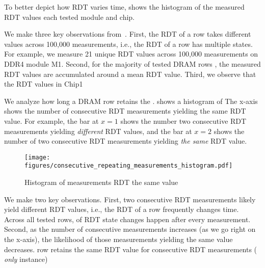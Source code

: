 To better depict how RDT varies  time,
 shows the histogram of the measured RDT values  each tested module and chip.


We make three key observations from~. First,
the RDT of a row takes  different values across 100,000
measurements, i.e., the RDT of a row has multiple states. For example, we
measure 21 unique RDT values across 100,000 measurements on DDR4 module M1.
Second, for the majority of tested DRAM rows , the
measured RDT values are accumulated around a mean RDT value. Third, we observe
that the RDT values in  Chip1 

We analyze how long a DRAM row retains the .  shows
a histogram of 
The x-axis shows the number of consecutive RDT measurements yielding the same
RDT value. For example, the bar at $x = 1$ shows the number  two
consecutive RDT measurements yielding \emph{different} RDT values, and the bar
at $x = 2$ shows the number of two consecutive RDT measurements yielding
\emph{the same} RDT value.

\begin{figure}[!ht]
    \centering
    \texttt{[image: figures/consecutive\_repeating\_measurements\_histogram.pdf]}
    \caption{Histogram of  measurements  RDT  the same value}
    \label{fig:consecutive_repeating_measurements}
\end{figure}


We make two key observations. First, two consecutive RDT measurements likely
yield different RDT values, i.e., the RDT of a row frequently changes  time.
Across all tested rows,  of RDT state changes happen after every
measurement. Second, as the number of consecutive measurements increases (as we
go right on the x-axis), the likelihood of those measurements yielding the same
value decreases.  row retains the same RDT value for 
consecutive RDT measurements  (
\emph{only}  instance)


